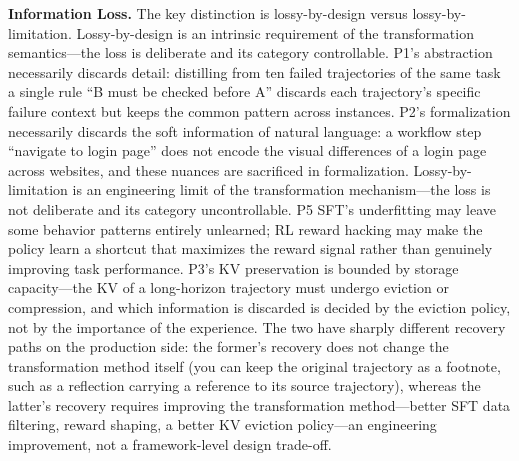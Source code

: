 \textbf{Information Loss.} The key distinction is lossy-by-design versus lossy-by-limitation. Lossy-by-design is an intrinsic requirement of the transformation semantics---the loss is deliberate and its category controllable. P1's abstraction necessarily discards detail: distilling from ten failed trajectories of the same task a single rule ``B must be checked before A'' discards each trajectory's specific failure context but keeps the common pattern across instances. P2's formalization necessarily discards the soft information of natural language: a workflow step ``navigate to login page'' does not encode the visual differences of a login page across websites, and these nuances are sacrificed in formalization. Lossy-by-limitation is an engineering limit of the transformation mechanism---the loss is not deliberate and its category uncontrollable. P5 SFT's underfitting may leave some behavior patterns entirely unlearned; RL reward hacking may make the policy learn a shortcut that maximizes the reward signal rather than genuinely improving task performance. P3's KV preservation is bounded by storage capacity---the KV of a long-horizon trajectory must undergo eviction or compression, and which information is discarded is decided by the eviction policy, not by the importance of the experience. The two have sharply different recovery paths on the production side: the former's recovery does not change the transformation method itself (you can keep the original trajectory as a footnote, such as a reflection carrying a reference to its source trajectory), whereas the latter's recovery requires improving the transformation method---better SFT data filtering, reward shaping, a better KV eviction policy---an engineering improvement, not a framework-level design trade-off.

